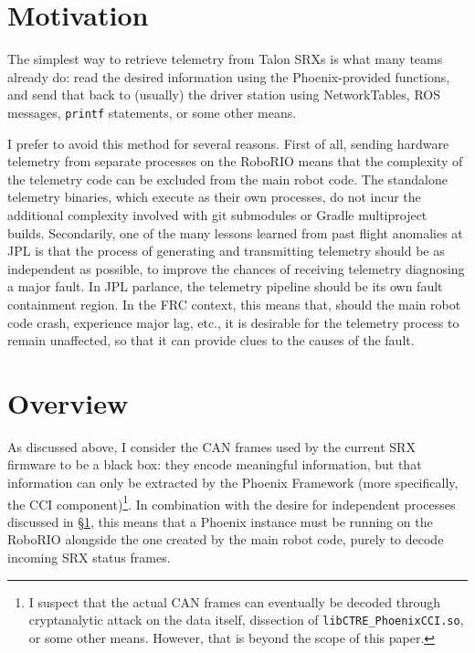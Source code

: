 \documentclass[12pt]{article}
\begin{document}
\section{Motivation}
\label{sec:motivation}
\par The simplest way to retrieve telemetry from Talon SRXs is what many teams already do: read the desired information using the Phoenix-provided functions, and send that back to (usually) the driver station using NetworkTables, ROS messages, \texttt{printf} statements, or some other means.
\par I prefer to avoid this method for several reasons. First of all, sending hardware telemetry from separate processes on the RoboRIO means that the complexity of the telemetry code can be excluded from the main robot code. The standalone telemetry binaries, which execute as their own processes, do not incur the additional complexity involved with git submodules or Gradle multiproject builds. Secondarily, one of the many lessons learned from past flight anomalies at JPL is that the process of generating and transmitting telemetry should be as independent as possible, to improve the chances of receiving telemetry diagnosing a major fault. In JPL parlance, the telemetry pipeline should be its own fault containment region. In the FRC context, this means that, should the main robot code crash, experience major lag, etc., it is desirable for the telemetry process to remain unaffected, so that it can provide clues to the causes of the fault. 

\section{Overview}
\par As discussed above, I consider the CAN frames used by the current SRX firmware to be a black box: they encode meaningful information, but that information can only be extracted by the Phoenix Framework (more specifically, the CCI component)\footnote{I suspect that the actual CAN frames can eventually be decoded through cryptanalytic attack on the data itself, dissection of \texttt{libCTRE\_PhoenixCCI.so}, or some other means. However, that is beyond the scope of this paper.}. In combination with the desire for independent processes discussed in \S \ref{sec:motivation}, this means that a Phoenix instance must be running on the RoboRIO alongside the one created by the main robot code, purely to decode incoming SRX status frames. 
\end{document}
